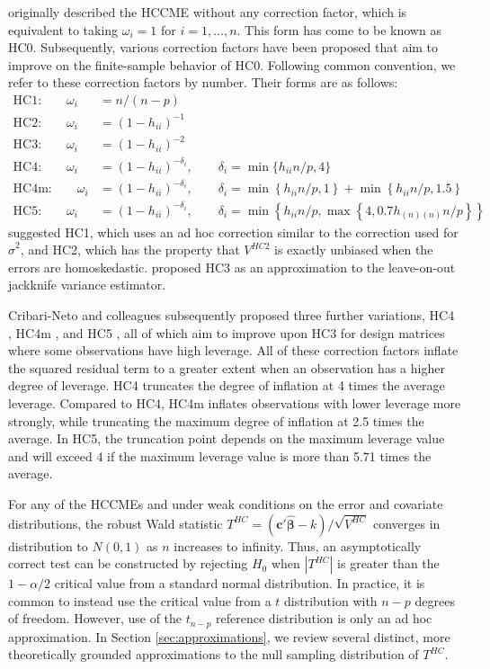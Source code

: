 \documentclass[12pt]{article}\usepackage[]{graphicx}\usepackage[]{color}
\newcommand{\bm}{\mathbf}
\newcommand{\bs}{\boldsymbol}
\begin{document}
\citet{White1980heteroskedasticity} originally described the HCCME without any correction factor, which is equivalent to taking $\omega_i = 1$ for $i = 1,...,n$. 
This form has come to be known as HC0. 
Subsequently, various correction factors have been proposed that aim to improve on the finite-sample behavior of HC0. 
Following common convention, we refer to these correction factors by number.
Their forms are as follows:
\begin{align*}
\text{HC1:} \qquad \omega_i &= n / (n - p) \\
\text{HC2:} \qquad \omega_i &= (1 - h_{ii})^{-1} \\
\text{HC3:} \qquad \omega_i &= (1 - h_{ii})^{-2} \\
\text{HC4:} \qquad \omega_i &= (1 - h_{ii})^{-\delta_i}, \qquad \delta_i = \min\{h_{ii} n / p, 4\} \\
\text{HC4m:} \qquad \omega_i &= (1 - h_{ii})^{-\delta_i}, \qquad \delta_i = \min\left\{h_{ii} n / p, 1 \right\} + \min\left\{h_{ii} n / p, 1.5 \right\} \\
\text{HC5:} \qquad \omega_i &= (1 - h_{ii})^{-\delta_i}, \qquad \delta_i = \min\left\{h_{ii} n / p, \max \left\{4, 0.7 h_{(n)(n)} n / p\right\}\right\}
\end{align*}
\citet{MacKinnon1985some} suggested HC1, which uses an ad hoc correction similar to the correction used for $\hat\sigma^2$, and HC2, which has the property that $V^{HC2}$ is exactly unbiased when the errors are homoskedastic. 
\citet{Davidson1993estimation} proposed HC3 as an approximation to the leave-on-out jackknife variance estimator. 

Cribari-Neto and colleagues subsequently proposed three further variations, HC4 \citep{Cribari-Neto2004asymptotic}, HC4m \citep{Cribari-Neto2011new}, and HC5 \citep{Cribari-Neto2007inference}, all of which aim to improve upon HC3 for design matrices where some observations have high leverage. 
All of these correction factors inflate the squared residual term to a greater extent when an observation has a higher degree of leverage. 
HC4 truncates the degree of inflation at 4 times the average leverage. 
Compared to HC4, HC4m inflates observations with lower leverage more strongly, while truncating the maximum degree of inflation at 2.5 times the average. 
In HC5, the truncation point depends on the maximum leverage value and will exceed 4 if the maximum leverage value is more than 5.71 times the average. 

For any of the HCCMEs and under weak conditions on the error and covariate distributions, the robust Wald statistic $T^{HC} = \left(\bm{c}'\bs{\hat\beta} - k\right) / \sqrt{V^{HC}}$ converges in distribution to $N(0,1)$ as $n$ increases to infinity. 
Thus, an asymptotically correct test can be constructed by rejecting $H_0$ when $\left|T^{HC}\right|$ is greater than the $1 - \alpha / 2$ critical value from a standard normal distribution. 
In practice, it is common to instead use the critical value from a $t$ distribution with $n - p$ degrees of freedom. 
However, use of the $t_{n-p}$ reference distribution is only an ad hoc approximation. In Section \ref{sec:approximations}, we review several distinct, more theoretically grounded approximations to the null sampling distribution of $T^{HC}$. 
\end{document}
